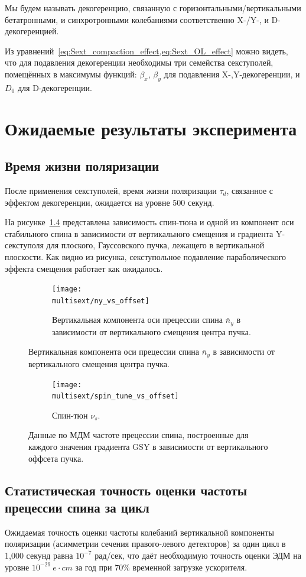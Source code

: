 \documentclass{report}
\newcommand{\LTd}{\tau_d}
\newcommand{\home}{\string~}
\newcommand{\Artem}{\home/REPOS/COSYINF/img/Artem}
\newcommand{\multisext}{\Artem/multisext_test}
\begin{document}
Мы будем называть декогеренцию, связанную с
горизонтальными/вертикальными бетатронными, и синхротронными
колебаниями соответственно X-/Y-, и D-декогеренцией. 

Из уравнений~\cref{eq:Sext_compaction_effect,eq:Sext_OL_effect} можно
видеть, что для подавления декогеренции необходимы три семейства
секступолей, помещённых в максимумы функций: $\beta_x$, $\beta_y$ для подавления
X-,Y-декогеренции, и $D_0$ для D-декогеренции.


\chapter{Ожидаемые результаты эксперимента}
\section{Время жизни поляризации}
После применения секступолей, время жизни поляризации $\LTd$, связанное с эффектом декогеренции, ожидается на уровне 500 секунд.

На рисунке~\ref{fig:DECOH_GSY_variation} представлена зависимость спин-тюна и одной из компонент оси стабильного спина в зависимости от вертикального смещения и градиента Y-секступоля для плоского, Гауссовского пучка, лежащего в вертикальной плоскости. Как видно из рисунка, секступольное подавление параболического эффекта смещения работает как ожидалось.
\begin{figure}[H]
  \centering
  \begin{subfigure}[b]{\textwidth}
    \texttt{[image: \\multisext/ny\_vs\_offset]}
    \caption{Вертикальная компонента оси прецессии спина $\bar n_y$ в зависимости
      от вертикального смещения центра пучка.\label{fig:DECOH_full_ny}}
  \end{subfigure}
\end{figure}
\begin{figure}[H]\ContinuedFloat
  \centering
  \begin{subfigure}[b]{\textwidth}
    \texttt{[image: \\multisext/spin\_tune\_vs\_offset]}
    \caption{Спин-тюн $\nu_s$.\label{fig:SpinTune_vs_Y0_GSY}}
  \end{subfigure}
  \caption{Данные по МДМ частоте прецессии спина, построенные для каждого значения градиента GSY
    в зависимости от вертикального оффсета пучка.\label{fig:DECOH_GSY_variation}}
\end{figure}
\section{Статистическая точность оценки частоты прецессии спина за цикл}
Ожидаемая точность оценки частоты колебаний вертикальной компоненты поляризации (асимметрии сечения правого-левого детекторов) за один цикл в 1,000 секунд равна $10^{-7}$ рад/сек, что даёт необходимую точность оценки ЭДМ на уровне $10^{-29}~e\cdot cm$ за год при 70\% временной загрузке ускорителя.
\end{document}
